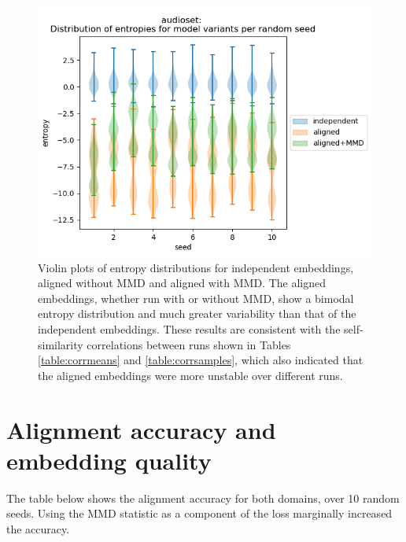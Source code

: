 \begin{figure}[H]
\label{fig:entropyviolinaudio}
\centering
\includegraphics[width=\textwidth]{images/results/audioset_entropies_violin.png}
\caption{Violin plots of entropy distributions for independent embeddings, aligned without MMD and aligned with MMD. The aligned embeddings, whether run with or without MMD, show a bimodal entropy distribution and much greater variability than that of the independent embeddings.  These results are consistent with the self-similarity correlations between runs shown in Tables \ref{table:corrmeans} and \ref{table:corrsamples}, which also indicated that the aligned embeddings were more unstable over different runs. }
\end{figure}

\newpage
\section{Alignment accuracy and embedding quality}
\label{section:quality}
The table below shows the alignment accuracy for both domains, over 10 random seeds. Using the MMD statistic as a component of the loss marginally increased the accuracy. 

